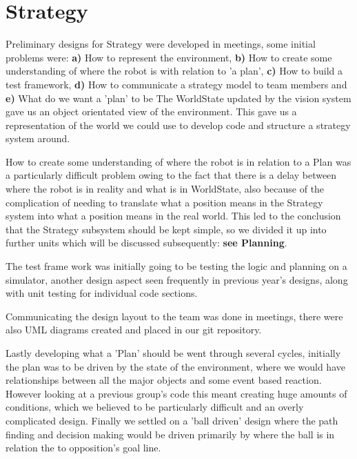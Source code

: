 \section{Strategy}


Preliminary designs for Strategy were developed in meetings, some initial 
problems were:\newline
{\bf a)} How to represent the environment, {\bf b)} How to create some 
understanding of where the robot is with relation to 'a plan', 
{\bf c)} How to build a test framework, {\bf d)} How to communicate a 
strategy model to team members and {\bf e)} What do we want a 'plan' to be
\newline
The WorldState updated by the vision system gave us an object orientated view
of the environment. This gave us a representation of the world we could use
to develop code and structure a strategy system around.

How to create some understanding of where the robot is in relation to a Plan
was a particularly difficult problem owing to the fact that there is a delay 
between where the robot is in reality and what is in WorldState, also 
because of the complication of needing to translate what a position means in the 
Strategy system into what a position means in the real world. This led to the 
conclusion that the Strategy subsystem should be kept simple, so we divided it 
up into further units which will be discussed subsequently: {\bf see Planning}.

The test frame work was initially going to be testing the logic and planning 
on a simulator, another design aspect seen frequently in previous year's designs,
along with unit testing for individual code sections.

Communicating the design layout to the team was done in meetings, there were 
also UML diagrams created and placed in our git repository.

Lastly developing what a 'Plan' should be went through several cycles, initially
the plan was to be driven by the state of the environment, where we would have 
relationships between all the major objects and some event based reaction. 
However looking at a previous group's code this meant creating huge amounts of
conditions, which we believed to be particularly difficult and an overly 
complicated design. Finally we settled on a 'ball driven' design where the 
path finding and decision making would be driven primarily by where the ball is
in relation the to opposition's goal line.

